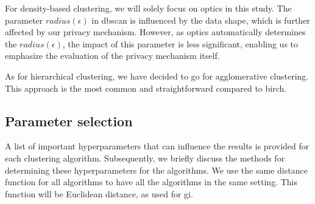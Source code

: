 For density-based clustering, we will solely focus on \gls{optics} in this study.
The parameter $radius (\epsilon)$ in \gls{dbscan} is influenced by the data shape, which is further affected by our privacy mechanism.
However, as \gls{optics} automatically determines the $radius(\epsilon)$, the impact of this parameter is less significant, enabling us to emphasize the evaluation of the privacy mechanism itself.

As for hierarchical clustering, we have decided to go for agglomerative clustering.
This approach is the most common and straightforward compared to \gls{birch}.


\subsection{Parameter selection}
A list of important hyperparameters that can influence the results is provided for each clustering algorithm.
Subsequently, we briefly discuss the methods for determining these hyperparameters for the algorithms. \newline
We use the same distance function for all algorithms to have all the algorithms in the same setting.
This function will be Euclidean distance, as used for \gls{gi}.
